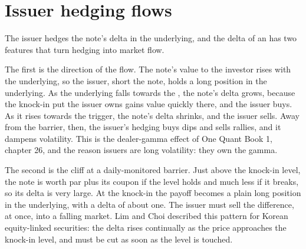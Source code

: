 \begin{omfigure}

\label{fig:dv:autocallables:coupons}
\end{omfigure}

\section{Issuer hedging flows}

The issuer hedges the note's delta in the underlying, and the delta of an  has two features that turn hedging into
market flow.

The first is the direction of the flow. The note's value to the investor rises with the underlying, so the issuer, short the note,
holds a long position in the underlying. As the underlying falls towards the , the note's delta grows, because the
knock-in put the issuer owns gains value quickly there, and the issuer buys. As it rises towards the trigger, the note's delta
shrinks, and the issuer sells. Away from the barrier, then, the issuer's hedging buys dips and sells rallies, and it dampens
volatility. This is the dealer-gamma effect of One Quant Book 1, chapter 26, and the reason issuers are long volatility: they own
the gamma.

The second is the cliff at a daily-monitored barrier. Just above the knock-in level, the note is worth par plus its coupon if the
level holds and much less if it breaks, so its delta is very large. At the knock-in the payoff becomes a plain long position in the
underlying, with a delta of about one. The issuer must sell the difference, at once, into a falling market. Lim and Choi described
this pattern for Korean equity-linked securities: the delta rises continually as the price approaches the knock-in level, and must
be cut as soon as the level is touched.


